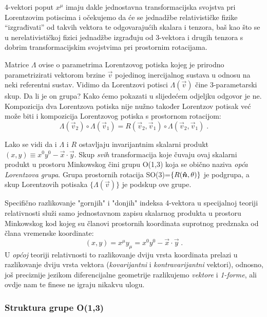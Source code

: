 4-vektori poput $x^\mu$ imaju dakle jednostavna transformacijska
svojstva pri Lorentzovim potiscima i očekujemo da će se jednadžbe
relativističke fizike ``izgrađivati'' od takvih vektora te odgovarajućih
skalara i tenzora, baš kao što se u nerelativističkoj fizici jednadžbe
izgrađuju od 3-vektora i drugih tenzora s dobrim transformacijskim 
svojstvima pri prostornim rotacijama.

Matrice $\Lambda$ ovise o parametrima Lorentzovog
potiska kojeg je prirodno parametrizirati vektorom brzine $\vec{v}$ pojedinog
inercijalnog sustava u odnosu na neki referentni sustav.
 Vidimo da Lorentzovi potisci $\Lambda(\vec{v})$ čine 3-parametarski
skup. Da li je on grupa? Kako ćemo pokazati u slijedećem
odjeljku odgovor je ne. Kompozicija dva Lorentzova potiska nije
nužno također Lorentzov potisak već može biti i kompozicija
Lorentzovog potiska s prostornom rotacijom:
\begin{equation}
 \Lambda(\vec{v}_2) \circ \Lambda(\vec{v}_1)
  = R(\vec{v}_2,\vec{v}_1) \circ \Lambda(\vec{v}_2,\vec{v}_1) \;.
\end{equation}

Lako se vidi da i $\Lambda$ i $R$ ostavljaju invarijantnim
skalarni produkt $(x,y)\equiv x^{0}y^0 - \vec{x}\cdot\vec{y}$. Skup \emph{svih}
transformacija koje čuvaju ovaj skalarni produkt u prostoru Minkowskog
čini grupu O(1,3) koja se obično naziva \emph{opća Lorentzova grupa}.
Grupa prostornih rotacija SO(3)=$\{R(\unitn, \theta)\}$ 
je podgrupa, a skup Lorentzovih
potisaka $\{\Lambda(\vec{v})\}$ je podskup ove grupe.

Specifično razlikovanje "gornjih" i "donjih" indeksa 4-vektora u
specijalnoj teoriji relativnosti služi samo jednostavnom zapisu
skalarnog produkta u prostoru Minkowskog kod kojeg su članovi
prostornih koordinata suprotnog predznaka od člana vremenske koordinate:
\begin{equation}
 (x,y) = x^\mu y_\mu = x^0 y^0 - \vec{x}\cdot\vec{y} \;.
\end{equation}
U \emph{općoj} teoriji relativnosti to razlikovanje dviju vrsta
koordinata prelazi u razlikovanje dviju vrsta vektora 
(\emph{kovarijantni} i \emph{kontravarijantni} vektori), odnosno,
još preciznije jezikom diferencijalne geometrije razlikujemo 
\emph{vektore} i \emph{1-forme}, ali ovdje nam te finese ne igraju
nikakvu ulogu.

\subsubsection*{Struktura grupe O(1,3)}

